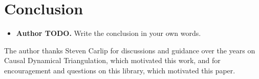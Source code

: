 \documentclass[manuscript,nonacm]{acmart}
\newcommand{\AuthorTodo}[1]{\textbf{Author TODO.} #1}
\begin{document}
\section{Conclusion}

\begin{itemize}
  \item \AuthorTodo{Write the conclusion in your own words.}
\end{itemize}

\begin{acks}
  The author thanks Steven Carlip for discussions and guidance over
  the years on Causal Dynamical Triangulation, which motivated this work,
  and for encouragement and questions on this library, which
  motivated this paper.
\end{acks}

\nocite{*}


\end{document}
